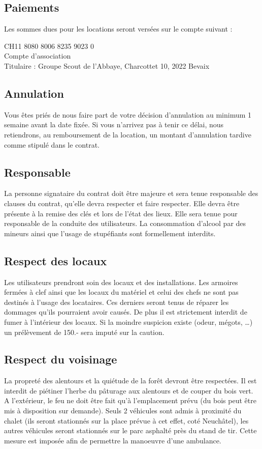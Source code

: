 \documentclass[a4paper,12pt]{extarticle}
\begin{document}
\subsection{Paiements}
Les sommes dues pour les locations seront versées sur le compte suivant :

CH11 8080 8006 8235 9023 0 \\
Compte d'association \\
Titulaire : Groupe Scout de l'Abbaye, Charcottet 10, 2022 Bevaix \\

\subsection{Annulation}

Vous êtes priés de nous faire part de votre décision d'annulation au minimum 1 semaine avant la date fixée.
Si vous n'arrivez pas à tenir ce délai, nous retiendrons, au remboursement de la location, un montant d'annulation tardive comme stipulé dans le contrat.

\subsection{Responsable}
La personne signataire du contrat doit être majeure et sera tenue responsable des clauses du contrat, qu'elle devra respecter et faire respecter.
Elle devra être présente à la remise des clés et lors de l'état des lieux. Elle sera tenue pour responsable de la conduite des utilisateurs.
La consommation d'alcool par des mineurs ainsi que l'usage de stupéfiants sont formellement interdits.

\subsection{Respect des locaux}
Les utilisateurs prendront soin des locaux et des installations.
Les armoires fermées à clef ainsi que les locaux du matériel et celui des chefs ne sont pas destinés à l'usage des locataires.
Ces derniers seront tenus de réparer les dommages qu'ils pourraient avoir causés.
De plus {\color{red} il est strictement interdit de fumer à l'intérieur des locaux.}
Si la moindre suspicion existe (odeur, mégots, …) un prélèvement de 150.- sera imputé sur la caution.

\subsection{Respect du voisinage}
La propreté des alentours et la quiétude de la forêt devront être respectées.
Il est interdit de piétiner l'herbe du pâturage aux alentours et de couper du bois vert.
A l'extérieur, le feu ne doit être fait qu'à l'emplacement prévu (du bois peut être mis à disposition sur demande).
Seuls 2 véhicules sont admis à proximité du chalet (ils seront stationnés sur la place prévue à cet effet, coté Neuchâtel), les autres véhicules seront stationnés sur le parc asphalté près du stand de tir. Cette mesure est imposée afin de permettre la manoeuvre d'une ambulance.
\end{document}
